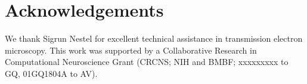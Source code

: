 \documentclass[fleqn,10pt]{wlscirep}
\begin{document}
\nocite{*}


\section*{Acknowledgements}

We thank Sigrun Nestel for excellent technical assistance in transmission electron microscopy. This work was supported by a Collaborative Research in Computational Neuroscience Grant (CRCNS; NIH and BMBF; xxxxxxxxx to GQ, 01GQ1804A to AV).
\end{document}

